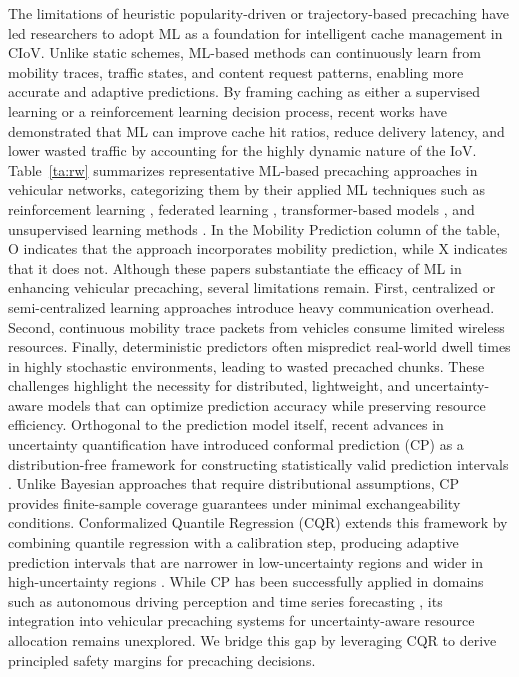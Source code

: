\documentclass[journal]{IEEEtran}
\begin{document}
The limitations of heuristic popularity-driven or trajectory-based precaching have led researchers to adopt ML as a foundation for intelligent cache management in CIoV.
Unlike static schemes, ML-based methods can continuously learn from mobility traces, traffic states, and content request patterns, enabling more accurate and adaptive predictions.
By framing caching as either a supervised learning or a reinforcement learning decision process, recent works have demonstrated that ML can improve cache hit ratios, reduce delivery latency, and lower wasted traffic by accounting for the highly dynamic nature of the IoV.
Table~\ref{ta:rw} summarizes representative ML-based precaching approaches in vehicular networks, categorizing them by their applied ML techniques such as reinforcement learning \cite{Wang2023, Elsayed2022}, federated learning \cite{Jiang2024, Maale2023, Khanal2022}, transformer-based models \cite{Wang2025}, and unsupervised learning methods \cite{Zhang2024}.
In the Mobility Prediction column of the table, O indicates that the approach incorporates mobility prediction, while X indicates that it does not.
Although these papers substantiate the efficacy of ML in enhancing vehicular precaching, several limitations remain.
First, centralized or semi-centralized learning approaches introduce heavy communication overhead.
Second, continuous mobility trace packets from vehicles consume limited wireless resources.
Finally, deterministic predictors often mispredict real-world dwell times in highly stochastic environments, leading to wasted precached chunks.
These challenges highlight the necessity for distributed, lightweight, and uncertainty-aware models that can optimize prediction accuracy while preserving resource efficiency.
Orthogonal to the prediction model itself, recent advances in uncertainty quantification have introduced conformal prediction (CP) as a distribution-free framework for constructing statistically valid prediction intervals \cite{x11}.
Unlike Bayesian approaches that require distributional assumptions, CP provides finite-sample coverage guarantees under minimal exchangeability conditions.
Conformalized Quantile Regression (CQR) extends this framework by combining quantile regression with a calibration step, producing adaptive prediction intervals that are narrower in low-uncertainty regions and wider in high-uncertainty regions \cite{Angelopoulos2023}.
While CP has been successfully applied in domains such as autonomous driving perception \cite{Lindemann2023} and time series forecasting \cite{Zaffran2022}, its integration into vehicular precaching systems for uncertainty-aware resource allocation remains unexplored.
We bridge this gap by leveraging CQR to derive principled safety margins for precaching decisions.
\end{document}
